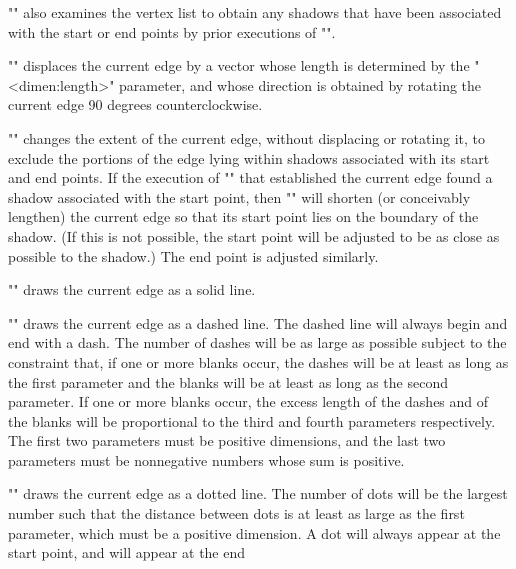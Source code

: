 \documentclass[11pt]{article}
\begin{document}
"\setedge" also examines the vertex list to obtain any shadows that have been
associated with the start or end points by prior executions of "\vertex".
\begin{myverb}
\end{myverb}
"\shiftedge" displaces the current edge by a vector whose length is determined
by the "<dimen:length>" parameter, and whose direction is obtained by rotating
the current edge 90 degrees counterclockwise.
\begin{myverb}
    \shadeedge
\end{myverb}
"\shadeedge" changes the extent of the current edge, without displacing
or rotating it, to exclude the portions of the edge lying within shadows
associated with its start and end points.  If the execution of "\setedge" that
established the current edge found a shadow associated with the start point,
then "\shadedge" will shorten (or conceivably lengthen) the current edge
so that its start point lies on the boundary of the shadow.  (If this is
not possible, the start point will be adjusted to be as close as possible
to the shadow.)  The end point is adjusted similarly.
\begin{myverb}
    \drawsolidedge
\end{myverb}
"\drawsolidedge" draws the current edge as a solid line.  
\begin{myverb}
\end{myverb}
"\drawdashedge" draws the current edge as a dashed line. The dashed line
will always begin and end with a dash. The number of dashes will be as
large as possible subject to the constraint that, if one or more blanks
occur, the dashes will be at least as long as the first parameter and
the blanks will be at least as long as the second parameter. If one or
more blanks occur, the excess length of the dashes and of the blanks
will be proportional to the third and fourth parameters respectively.
The first two parameters must be positive dimensions, and the last two
parameters must be nonnegative numbers whose sum is positive.
\begin{myverb}
\end{myverb}
"\drawdotedge" draws the current edge as a dotted line.  The number of dots
will be the largest number such that the distance between dots is at least
as large as the first parameter, which must be a positive dimension.
A dot will always appear at the start point, and will appear at the end
\end{document}
